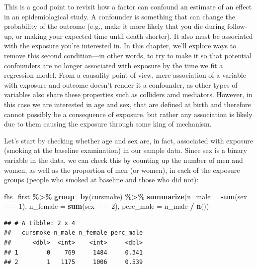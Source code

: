 \documentclass[
]{book}
\newenvironment{Shaded}{\begin{snugshade}}{\end{snugshade}}
\newcommand{\AttributeTok}[1]{\textcolor[rgb]{0.13,0.29,0.53}{#1}}
\newcommand{\DecValTok}[1]{\textcolor[rgb]{0.00,0.00,0.81}{#1}}
\newcommand{\FunctionTok}[1]{\textcolor[rgb]{0.13,0.29,0.53}{\textbf{#1}}}
\newcommand{\NormalTok}[1]{#1}
\newcommand{\SpecialCharTok}[1]{\textcolor[rgb]{0.81,0.36,0.00}{\textbf{#1}}}
\begin{document}
This is a good point to revisit how a factor can confound an estimate of an effect in an epidemiological study. A confounder is something that can change the probability of the outcome (e.g., make it more likely that you die during follow-up, or making your expected time until death shorter). It also must be associated with the exposure you're interested in. In this chapter, we'll explore ways to remove this second condition---in other words, to try to make it so that potential confounders are no longer associated with exposure by the time we fit a regression model. From a causality point of view, mere association of a variable with exposure and outcome doesn't render it a confounder, as other types of variables also share these properties such as colliders amd mediators. However, in this case we are interested in age and sex, that are defined at birth and therefore cannot possibly be a consequence of exposure, but rather any association is likely due to them causing the exposure through some king of mechanism.

Let's start by checking whether age and sex are, in fact, associated with exposure (smoking at the baseline examination) in our sample data. Since sex is a binary variable in the data, we can check this by counting up the number of men and women, as well as the proportion of men (or women), in each of the exposure groups (people who smoked at baseline and those who did not):

\begin{Shaded}
\begin{Highlighting}[]
\NormalTok{fhs\_first }\SpecialCharTok{\%\textgreater{}\%} 
  \FunctionTok{group\_by}\NormalTok{(cursmoke) }\SpecialCharTok{\%\textgreater{}\%} 
  \FunctionTok{summarize}\NormalTok{(}\AttributeTok{n\_male =} \FunctionTok{sum}\NormalTok{(sex }\SpecialCharTok{==} \DecValTok{1}\NormalTok{), }
            \AttributeTok{n\_female =} \FunctionTok{sum}\NormalTok{(sex }\SpecialCharTok{==} \DecValTok{2}\NormalTok{), }
            \AttributeTok{perc\_male =}\NormalTok{ n\_male }\SpecialCharTok{/} \FunctionTok{n}\NormalTok{())}
\end{Highlighting}
\end{Shaded}

\begin{verbatim}
## # A tibble: 2 x 4
##   cursmoke n_male n_female perc_male
##      <dbl>  <int>    <int>     <dbl>
## 1        0    769     1484     0.341
## 2        1   1175     1006     0.539
\end{verbatim}
\end{document}
